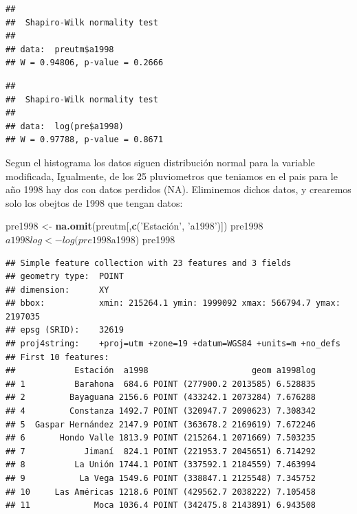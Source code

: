 \documentclass[11pt,]{article}
\newenvironment{Shaded}{\begin{snugshade}}{\end{snugshade}}
\newcommand{\KeywordTok}[1]{\textcolor[rgb]{0.13,0.29,0.53}{\textbf{#1}}}
\newcommand{\StringTok}[1]{\textcolor[rgb]{0.31,0.60,0.02}{#1}}
\newcommand{\OperatorTok}[1]{\textcolor[rgb]{0.81,0.36,0.00}{\textbf{#1}}}
\newcommand{\NormalTok}[1]{#1}
\begin{document}
\begin{Shaded}
\end{Shaded}

\begin{verbatim}
## 
##  Shapiro-Wilk normality test
## 
## data:  preutm$a1998
## W = 0.94806, p-value = 0.2666
\end{verbatim}

\begin{Shaded}
\end{Shaded}

\begin{verbatim}
## 
##  Shapiro-Wilk normality test
## 
## data:  log(pre$a1998)
## W = 0.97788, p-value = 0.8671
\end{verbatim}

Segun el histograma los datos siguen distribución normal para la
variable modificada, Igualmente, de los 25 pluviometros que teniamos en
el pais para le año 1998 hay dos con datos perdidos (NA). Eliminemos
dichos datos, y crearemos solo los obejtos de 1998 que tengan datos:

\begin{Shaded}
\begin{Highlighting}[]
\NormalTok{pre1998 <-}\StringTok{ }\KeywordTok{na.omit}\NormalTok{(preutm[,}\KeywordTok{c}\NormalTok{(}\StringTok{'Estación', '}\NormalTok{a1998}\StringTok{')])}
\StringTok{pre1998$a1998log <- log(pre1998$a1998)}
\StringTok{pre1998}
\end{Highlighting}
\end{Shaded}

\begin{verbatim}
## Simple feature collection with 23 features and 3 fields
## geometry type:  POINT
## dimension:      XY
## bbox:           xmin: 215264.1 ymin: 1999092 xmax: 566794.7 ymax: 2197035
## epsg (SRID):    32619
## proj4string:    +proj=utm +zone=19 +datum=WGS84 +units=m +no_defs
## First 10 features:
##            Estación  a1998                     geom a1998log
## 1          Barahona  684.6 POINT (277900.2 2013585) 6.528835
## 2         Bayaguana 2156.6 POINT (433242.1 2073284) 7.676288
## 4         Constanza 1492.7 POINT (320947.7 2090623) 7.308342
## 5  Gaspar Hernández 2147.9 POINT (363678.2 2169619) 7.672246
## 6       Hondo Valle 1813.9 POINT (215264.1 2071669) 7.503235
## 7            Jimaní  824.1 POINT (221953.7 2045651) 6.714292
## 8          La Unión 1744.1 POINT (337592.1 2184559) 7.463994
## 9           La Vega 1549.6 POINT (338847.1 2125548) 7.345752
## 10     Las Américas 1218.6 POINT (429562.7 2038222) 7.105458
## 11             Moca 1036.4 POINT (342475.8 2143891) 6.943508
\end{verbatim}
\end{document}
